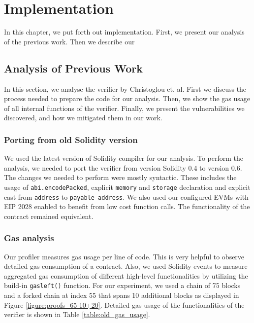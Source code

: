 \chapter{Implementation}

In this chapter, we put forth out implementation. First, we present our
analysis of the previous work. Then we describe our

\section{Analysis of Previous Work}

In this section, we analyse the verifier by Christoglou et. al. First we
discuss the process needed to prepare the code for our analysis. Then, we show
the gas usage of all internal functions of the verifier.  Finally, we present
the vulnerabilities we discovered, and how we mitigated them in our work.

\subsection{Porting from old Solidity version}

We used the latest version of Solidity compiler for our analysis. To perform
the analysis, we needed to port the verifier from version Solidity 0.4 to
version 0.6.  The changes we needed to perform were mostly syntactic. These
includes the usage of \texttt{abi.encodePacked}, explicit \texttt{memory} and
\texttt{storage} declaration and explicit cast from \texttt{address} to
\texttt{payable address}. We also used our configured EVMs with EIP 2028
enabled to benefit from low cost function calls. The functionality of the
contract remained equivalent.

\subsection{Gas analysis}

Our profiler measures gas usage per line of code. This is very helpful to
observe detailed gas consumption of a contract. Also, we used Solidity events
to measure aggregated gas consumption of different high-level functionalities
by utilizing the build-in \texttt{gasleft()} function. For our experiment, we
used a chain of 75 blocks and a forked chain at index 55 that spans 10
additional blocks as displayed in Figure \ref{figure:proofs_65-10+20}. Detailed
gas usage of the functionalities of the verifier is shown in Table
\ref{table:old_gas_usage}.

